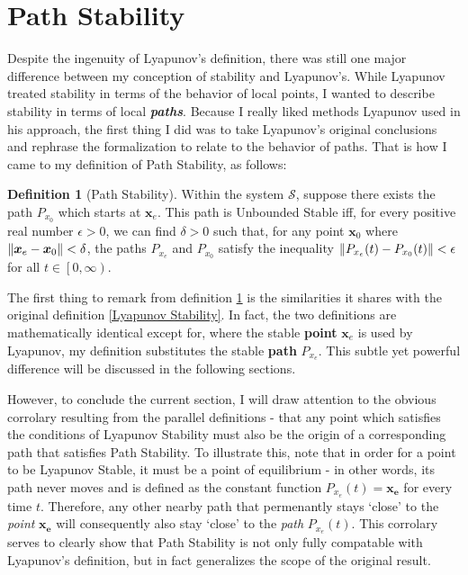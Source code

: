 \documentclass{article}
\newcommand{\B}[1]{\boldsymbol{#1}}
\DeclarePairedDelimiter\norm{\lVert}{\rVert}%
\theoremstyle{definition}
\newtheorem{definition}{Definition}[section]
\theoremstyle{remark}
\begin{document}
\section{Path Stability}
Despite the ingenuity of Lyapunov's definition, there was still one major difference between my conception of stability and Lyapunov's.
While Lyapunov treated stability in terms of the behavior of local points, I wanted to 
describe stability in terms of local \textbf{\textit{paths}}. Because I really liked
methods Lyapunov used in his approach, the first thing I did was to take Lyapunov's original 
conclusions and rephrase the formalization to relate to the behavior of paths. That 
is how I came to my definition of Path Stability, as follows:

\begin{definition}[Path Stability]
  \label{def:Path Stability}
  Within the system $\mathcal{S}$, suppose there exists the path $P_{x_0}$ which starts at $\B{x}_e$.
  This path is Unbounded Stable iff, for every positive real number $\epsilon > 0$, we can find $\delta > 0$ such that,
  for any point $\B{x}_0$ where $\norm{\B{x}_e - \B{x}_0} < \delta$,
  the paths $P_{x_e}$ and $P_{x_0}$ satisfy the inequality 
  $\norm{P_{x_e}(t) - P_{x_0}(t)} < \epsilon$
  for all $t \in \left[0, \infty \right)$.
\end{definition}

The first thing to remark from definition \ref{def:Path Stability} is the similarities it shares
with the original definition \ref{Lyapunov Stability}. In fact, the two definitions are 
mathematically identical except for, where the stable \textbf{point} $\B{x}_e$ is used
by Lyapunov, my definition substitutes the stable \textbf{path} $P_{x_e}$. This subtle 
yet powerful difference will be discussed in the following sections. 

However, to conclude the current section, I will draw attention to the obvious corrolary resulting from the 
parallel definitions - that any point which satisfies the conditions of Lyapunov 
Stability must also be the origin of a corresponding path that satisfies Path Stability.
To illustrate this, note that in order for a point to be Lyapunov Stable, it must be 
a point of equilibrium - in other words, its path never moves and is defined as the constant function 
$P_{x_e}(t) = \B{x_e}$ for every time $t$. Therefore, any other nearby path that permenantly stays 
`close' to the \textit{point} $\B{x_e}$ will consequently also stay `close' to the \textit{path} $P_{x_e}(t)$.
This corrolary serves to clearly show that Path Stability is not only fully compatable with Lyapunov's  
definition, but in fact generalizes the scope of the original result.  
\end{document}
